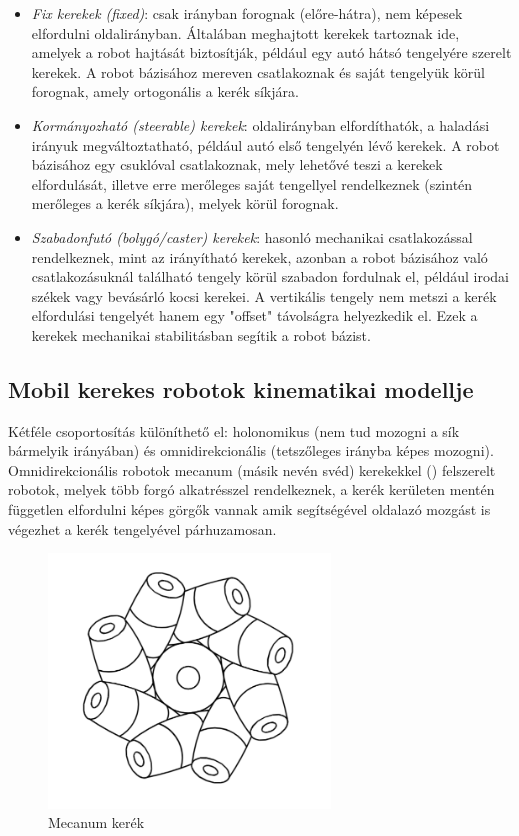 \begin{itemize}
    \item \emph{Fix kerekek (fixed)}: csak irányban forognak (előre-hátra), nem képesek elfordulni oldalirányban. Általában meghajtott kerekek tartoznak ide, amelyek a robot hajtását biztosítják, például egy autó hátsó tengelyére szerelt kerekek. A robot bázisához mereven csatlakoznak és saját tengelyük körül forognak, amely ortogonális a kerék síkjára.\cite{siciliano2010robotics}
    \item \emph{Kormányozható (steerable) kerekek}: oldalirányban elfordíthatók, a haladási irányuk megváltoztatható, például autó első tengelyén lévő kerekek. A robot bázisához egy csuklóval csatlakoznak, mely lehetővé teszi a kerekek elfordulását, illetve erre merőleges saját tengellyel rendelkeznek (szintén merőleges a kerék síkjára), melyek körül forognak.\cite{siciliano2010robotics}
    \item \emph{Szabadonfutó (bolygó/caster) kerekek}: hasonló mechanikai csatlakozással rendelkeznek, mint az irányítható kerekek, azonban a robot bázisához való csatlakozásuknál található tengely körül szabadon fordulnak el, például irodai székek vagy bevásárló kocsi kerekei. A vertikális tengely nem metszi a kerék elfordulási tengelyét hanem egy "offset" távolságra helyezkedik el. Ezek a kerekek mechanikai stabilitásban segítik a robot bázist.\cite{siciliano2010robotics}
\end{itemize}

\subsection{Mobil kerekes robotok kinematikai modellje}
Kétféle csoportosítás különíthető el: holonomikus (nem tud mozogni a sík bármelyik irányában) és omnidirekcionális (tetszőleges irányba képes mozogni). Omnidirekcionális robotok mecanum (másik nevén svéd) kerekekkel () felszerelt robotok, melyek több forgó alkatrésszel rendelkeznek, a kerék kerületen mentén független elfordulni képes görgők vannak amik segítségével oldalazó mozgást is végezhet a kerék tengelyével párhuzamosan. \cite{siciliano2010robotics} \cite{ros2_control_docs}

\begin{figure}[!ht]
    \centering
    \includegraphics[width=75mm, keepaspectratio]{figures/023_omni_wheel.png}
    \caption{Mecanum kerék \cite{siciliano2010robotics}}
    \label{fig:023_omni_wheel}
\end{figure}

